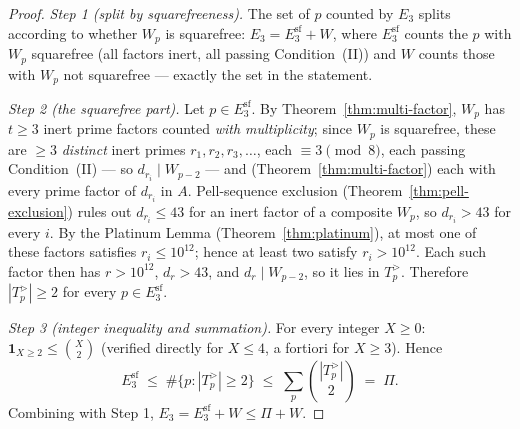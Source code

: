 \documentclass[11pt]{amsart}
\theoremstyle{plain}
\theoremstyle{definition}
\theoremstyle{remark}
\numberwithin{equation}{section}
\begin{document}
\begin{proof}
\emph{Step 1 (split by squarefreeness).} The set of $p$ counted by $E_3$ splits according to whether $W_p$ is squarefree: $E_3 = E_3^{\mathrm{sf}} + W$, where $E_3^{\mathrm{sf}}$ counts the $p$ with $W_p$ squarefree (all factors inert, all passing Condition~(II)) and $W$ counts those with $W_p$ not squarefree --- exactly the set in the statement.

\emph{Step 2 (the squarefree part).} Let $p \in E_3^{\mathrm{sf}}$. By Theorem~\ref{thm:multi-factor}, $W_p$ has $t \geq 3$ inert prime factors counted \emph{with multiplicity}; since $W_p$ is squarefree, these are $\geq 3$ \emph{distinct} inert primes $r_1, r_2, r_3, \dots$, each $\equiv 3 \pmod 8$, each passing Condition~(II) --- so $d_{r_i} \mid W_{p-2}$ --- and (Theorem~\ref{thm:multi-factor}) each with every prime factor of $d_{r_i}$ in $A$. Pell-sequence exclusion (Theorem~\ref{thm:pell-exclusion}) rules out $d_{r_i} \leq 43$ for an inert factor of a composite $W_p$, so $d_{r_i} > 43$ for every $i$. By the Platinum Lemma (Theorem~\ref{thm:platinum}), at most one of these factors satisfies $r_i \leq 10^{12}$; hence at least two satisfy $r_i > 10^{12}$. Each such factor then has $r > 10^{12}$, $d_r > 43$, and $d_r \mid W_{p-2}$, so it lies in $T_p^{>}$. Therefore $|T_p^{>}| \geq 2$ for every $p \in E_3^{\mathrm{sf}}$.

\emph{Step 3 (integer inequality and summation).} For every integer $X \geq 0$: $\mathbf{1}_{X \geq 2} \leq \binom{X}{2}$ (verified directly for $X \leq 4$, a fortiori for $X \geq 3$). Hence
\[
  E_3^{\mathrm{sf}} \;\leq\; \#\{p : |T_p^{>}| \geq 2\} \;\leq\; \sum_p \binom{|T_p^{>}|}{2} \;=\; \Pi.
\]
Combining with Step 1, $E_3 = E_3^{\mathrm{sf}} + W \leq \Pi + W$.
\end{proof}
\end{document}
